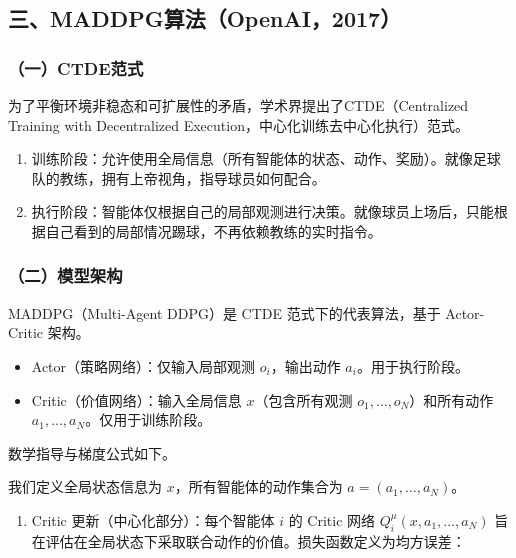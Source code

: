 \hypertarget{ux4e09maddpgux7b97ux6cd5openai2017}{%
\subsection{三、MADDPG算法（OpenAI，2017）}\label{ux4e09maddpgux7b97ux6cd5openai2017}}

\hypertarget{ux4e00ctdeux8303ux5f0f}{%
\subsubsection{（一）CTDE范式}\label{ux4e00ctdeux8303ux5f0f}}

为了平衡环境非稳态和可扩展性的矛盾，学术界提出了CTDE（Centralized Training with Decentralized Execution，中心化训练去中心化执行）范式。

\begin{enumerate}
\def\labelenumi{\arabic{enumi}.}
\item
  训练阶段：允许使用全局信息（所有智能体的状态、动作、奖励）。就像足球队的教练，拥有上帝视角，指导球员如何配合。
\item
  执行阶段：智能体仅根据自己的局部观测进行决策。就像球员上场后，只能根据自己看到的局部情况踢球，不再依赖教练的实时指令。
\end{enumerate}

\hypertarget{ux4e8cux6a21ux578bux67b6ux6784}{%
\subsubsection{（二）模型架构}\label{ux4e8cux6a21ux578bux67b6ux6784}}

MADDPG（Multi-Agent DDPG）是 CTDE 范式下的代表算法，基于 Actor-Critic 架构。

\begin{itemize}
\tightlist
\item
  Actor（策略网络）：仅输入局部观测 \(o_i\)，输出动作 \(a_i\)。用于执行阶段。
\item
  Critic（价值网络）：输入全局信息 \(x\)（包含所有观测 \(o_1,\ldots,o_N\)）和所有动作 \(a_1,\ldots,a_N\)。仅用于训练阶段。
\end{itemize}

数学指导与梯度公式如下。

我们定义全局状态信息为 \(x\)，所有智能体的动作集合为 \(a=(a_1,\ldots,a_N)\)。

\begin{enumerate}
\def\labelenumi{\arabic{enumi}.}
\tightlist
\item
  Critic 更新（中心化部分）：每个智能体 \(i\) 的 Critic 网络 \(Q_i^{\mu}(x,a_1,\ldots,a_N)\) 旨在评估在全局状态下采取联合动作的价值。损失函数定义为均方误差：
\end{enumerate}

